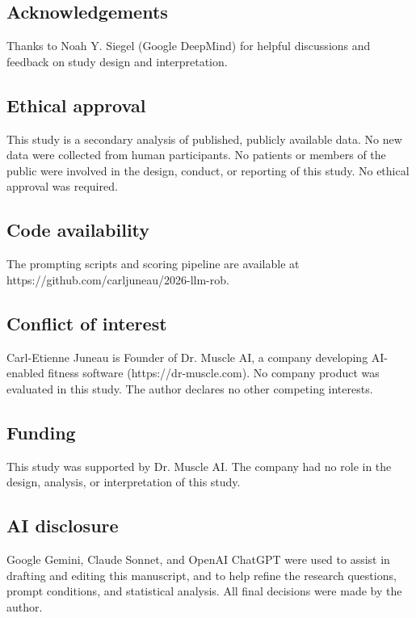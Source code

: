\documentclass[11pt,a4paper]{article}
\begin{document}
\subsection{Acknowledgements}

Thanks to Noah Y. Siegel (Google DeepMind) for helpful discussions and feedback on study design and interpretation.

\subsection{Ethical approval}

This study is a secondary analysis of published, publicly available data. No new data were collected from human participants. No patients or members of the public were involved in the design, conduct, or reporting of this study. No ethical approval was required.

\subsection{Code availability}

The prompting scripts and scoring pipeline are available at https://github.com/carljuneau/2026-llm-rob.

\subsection{Conflict of interest}

Carl-Etienne Juneau is Founder of Dr. Muscle AI, a company developing AI-enabled fitness software (https://dr-muscle.com). No company product was evaluated in this study. The author declares no other competing interests.

\subsection{Funding}

This study was supported by Dr. Muscle AI. The company had no role in the design, analysis, or interpretation of this study.

\subsection{AI disclosure}

Google Gemini, Claude Sonnet, and OpenAI ChatGPT were used to assist in drafting and editing this manuscript, and to help refine the research questions, prompt conditions, and statistical analysis. All final decisions were made by the author.
\end{document}
